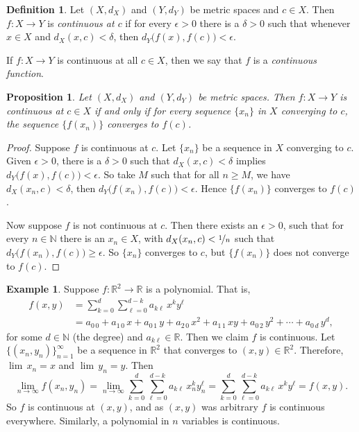 \documentclass[12pt,openany]{book}
\newcommand{\R}{{\mathbb{R}}}
\newcommand{\N}{{\mathbb{N}}}
\theoremstyle{plain}
\newtheorem{prop}[thm]{Proposition}
\theoremstyle{remark}
\theoremstyle{definition}
\newtheorem{defn}[thm]{Definition}
\theoremstyle{exercise}
\theoremstyle{example}
\newtheorem{example}[thm]{Example}
\begin{document}
\begin{defn}
Let $(X,d_X)$ and $(Y,d_Y)$ be metric spaces and $c \in X$.
Then $f \colon X \to Y$ is
\emph{continuous at $c$}
if for every $\epsilon > 0$
there is a $\delta > 0$ such that whenever $x \in X$ and $d_X(x,c) <
\delta$, then
$d_Y\bigl(f(x),f(c)\bigr) < \epsilon$.

If $f \colon X \to Y$ is continuous at all $c \in X$, then we say
that $f$ is a \emph{continuous function}.
\end{defn}

\begin{prop} \label{prop:contiscont}
Let $(X,d_X)$ and $(Y,d_Y)$ be metric spaces.
Then $f \colon X \to Y$ is
continuous at $c \in X$
if and only if for every sequence $\{ x_n \}$ in $X$
converging to $c$, the sequence $\{ f(x_n) \}$ converges
to $f(c)$.
\end{prop}

\begin{proof}
Suppose $f$ is continuous at $c$.  Let $\{ x_n \}$ be a
sequence in $X$ converging to $c$.  Given $\epsilon > 0$,
there is a $\delta > 0$ such that $d_X(x,c) < \delta$ implies
$d_Y\bigl(f(x),f(c)\bigr) < \epsilon$.  So take $M$ such that
for all $n \geq M$, we have $d_X(x_n,c) < \delta$, then
$d_Y\bigl(f(x_n),f(c)\bigr) < \epsilon$.  Hence $\{ f(x_n) \}$
converges to $f(c)$.

Now suppose $f$ is not continuous at $c$.
Then there exists an $\epsilon > 0$,
such that for every $n \in \N$ there is an $x_n \in X$,
with
$d_X(x_n,c) < \nicefrac{1}{n}$ such that $d_Y\bigl(f(x_n),f(c)\bigr) \geq
\epsilon$.  So $\{ x_n \}$ converges to $c$, but $\{ f(x_n) \}$
does not converge to $f(c)$.
\end{proof}

\begin{example}
Suppose $f \colon \R^2 \to \R$ is a polynomial.  That is,
\begin{equation*}
\begin{split}
f(x,y) & =
\sum_{k=0}^d
\sum_{\ell=0}^{d-k}
a_{k\ell}\,x^ky^\ell \\
& =
a_{0\,0} + a_{1\,0} \, x +
a_{0\,1} \, y+  
a_{2\,0} \, x^2+  
a_{1\,1} \, xy+  
a_{0\,2} \, y^2+ \cdots +
a_{0\,d} \, y^d ,
\end{split}
\end{equation*}
for some $d \in \N$ (the degree) and $a_{k\ell} \in \R$.  Then we claim 
$f$ is continuous.  Let $\{ (x_n,y_n) \}_{n=1}^\infty$ be a sequence
in $\R^2$ that converges to $(x,y) \in \R^2$.  Therefore,
$\lim\, x_n = x$ and $\lim\, y_n = y$.  Then
\begin{equation*}
\lim_{n\to\infty}
f(x_n,y_n) =
\lim_{n\to\infty}
\sum_{k=0}^d
\sum_{\ell=0}^{d-k}
a_{k\ell} \, x_n^ky_n^\ell 
=
\sum_{k=0}^d
\sum_{\ell=0}^{d-k}
a_{k\ell} \, x^ky^\ell
=
f(x,y) .
\end{equation*}
So $f$ is continuous at $(x,y)$, and as $(x,y)$ was arbitrary $f$ is
continuous everywhere.  Similarly, a
polynomial in $n$ variables is continuous.
\end{example}
\end{document}
